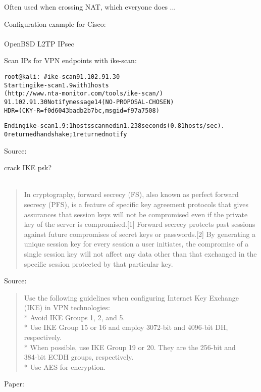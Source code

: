 \documentclass[Screen16to9,17pt]{foils}
\begin{document}
Often used when crossing NAT, which everyone does ...

Configuration example for Cisco:\\
{\small {}}\\
OpenBSD L2TP IPsec\\
{\small{}}

Scan IPs for VPN endpoints with ike-scan:
\begin{alltt}\small
root@kali:~# ike-scan 91.102.91.30
Starting ike-scan 1.9 with 1 hosts
(http://www.nta-monitor.com/tools/ike-scan/)
91.102.91.30	Notify message 14 (NO-PROPOSAL-CHOSEN)
HDR=(CKY-R=f0d6043badb2b7bc, msgid=f97a7508)

Ending ike-scan 1.9: 1 hosts scanned in 1.238 seconds (0.81 hosts/sec).
0 returned handshake; 1 returned notify
\end{alltt}

Source:\\
{\small{}}

crack IKE psk?\\
{\small
{} \\
}



\begin{quote}
In cryptography, forward secrecy (FS), also known as perfect forward secrecy (PFS), is a feature of specific key agreement protocols that gives assurances that session keys will not be compromised even if the private key of the server is compromised.[1] Forward secrecy protects past sessions against future compromises of secret keys or passwords.[2] By generating a unique session key for every session a user initiates, the compromise of a single session key will not affect any data other than that exchanged in the specific session protected by that particular key.
\end{quote}

Source: 




\begin{quote}\small
  Use the following guidelines when configuring Internet Key Exchange (IKE) in VPN technologies:\\
* Avoid IKE Groups 1, 2, and 5.\\
* Use IKE Group 15 or 16 and employ 3072-bit and 4096-bit DH, respectively.\\
* When possible, use IKE Group 19 or 20. They are the 256-bit and \\
384-bit ECDH groups, respectively.\\
* Use AES for encryption.
\end{quote}
Paper:
{\small {}}
\end{document}
